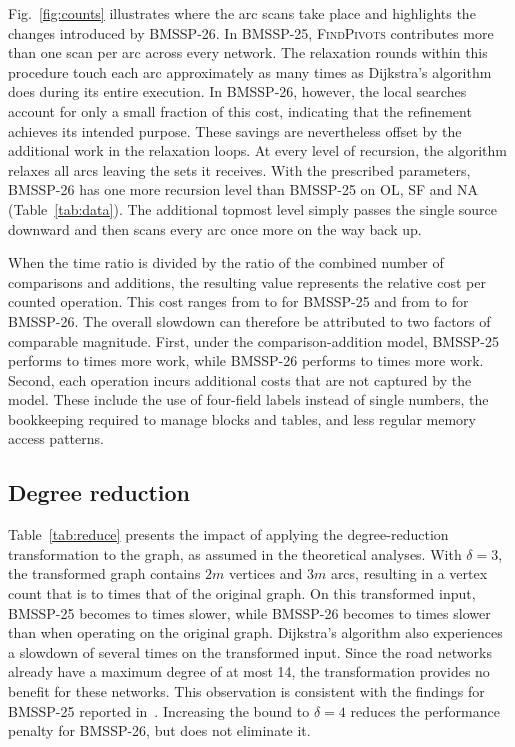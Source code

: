 \documentclass[conference,a4paper]{IEEEtran}
\newcommand{\bmA}{BMSSP-25}
\newcommand{\bmB}{BMSSP-26}
\newcommand{\fp}{\textsc{FindPivots}}
\begin{document}
Fig.~\ref{fig:counts} illustrates where the arc scans take place and highlights the changes
introduced by \bmB{}. In \bmA{}, \fp{} contributes more than one scan per arc across every network.
The relaxation rounds within this procedure touch each arc approximately as many times as Dijkstra's
algorithm does during its entire execution. In \bmB{}, however, the local searches account for only
a small fraction of this cost, indicating that the refinement achieves its intended purpose. These
savings are nevertheless offset by the additional work in the relaxation loops. At every level of
recursion, the algorithm relaxes all arcs leaving the sets it receives. With the prescribed
parameters, \bmB{} has one more recursion level than \bmA{} on OL, SF and NA (Table~\ref{tab:data}).
The additional topmost level simply passes the single source downward and then scans every arc once
more on the way back up.

When the time ratio is divided by the ratio of the combined number of comparisons and additions, the
resulting value represents the relative cost per counted operation. This cost ranges from
\PerOpMinTwoFive{} to \PerOpMaxTwoFive{} for \bmA{} and from \PerOpMinTwoSix{} to \PerOpMaxTwoSix{}
for \bmB{}. The overall slowdown can therefore be attributed to two factors of comparable magnitude.
First, under the comparison-addition model, \bmA{} performs \OpsRatioMinTwoFive{} to
\OpsRatioMaxTwoFive{} times more work, while \bmB{} performs \OpsRatioMinTwoSix{} to
\OpsRatioMaxTwoSix{} times more work. Second, each operation incurs additional costs that are not
captured by the model. These include the use of four-field labels instead of single numbers, the
bookkeeping required to manage blocks and tables, and less regular memory access patterns.

\subsection{Degree reduction}
Table~\ref{tab:reduce} presents the impact of applying the degree-reduction transformation to the
graph, as assumed in the theoretical analyses. With $\delta=3$, the transformed graph contains $2m$
vertices and $3m$ arcs, resulting in a vertex count that is \ReduceNGrowMin{} to \ReduceNGrowMax{}
times that of the original graph. On this transformed input, \bmA{} becomes \ReduceSlowMinTwoFive{}
to \ReduceSlowMaxTwoFive{} times slower, while \bmB{} becomes \ReduceSlowMinTwoSix{} to
\ReduceSlowMaxTwoSix{} times slower than when operating on the original graph. Dijkstra's algorithm
also experiences a slowdown of several times on the transformed input. Since the road networks
already have a maximum degree of at most 14, the transformation provides no benefit for these
networks. This observation is consistent with the findings for \bmA{} reported in~\cite{castro2025}.
Increasing the bound to $\delta=4$ reduces the performance penalty for \bmB{}, but does not
eliminate it.
\end{document}
